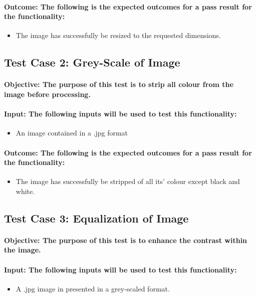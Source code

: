 \documentclass[a4paper,12pt]{report}
\begin{document}
	\paragraph{Outcome: The following is the expected outcomes for a pass result for the functionality:}
		\begin{itemize}
			\item The image has successfully be resized to the requested dimensions.
		\end{itemize}
		
	\subsection{Test Case 2: Grey-Scale of Image}
	\paragraph{Objective: The purpose of this test is to strip all colour from the image before processing.}
	\paragraph{Input: The following inputs will be used to test this functionality:}
	\begin{itemize}
		\item An image contained in a .jpg format
	\end{itemize}
	\paragraph{Outcome: The following is the expected outcomes for a pass result for the functionality:}
	\begin{itemize}
		\item The image has successfully be stripped of all its' colour except black and white.
	\end{itemize}	
		
	\subsection{Test Case 3: Equalization of Image}
	\paragraph{Objective: The purpose of this test is to enhance the contrast within the image.}
	\paragraph{Input: The following inputs will be used to test this functionality:}
	\begin{itemize}
		\item A .jpg image in presented in a grey-scaled format.
	\end{itemize}
\end{document}
